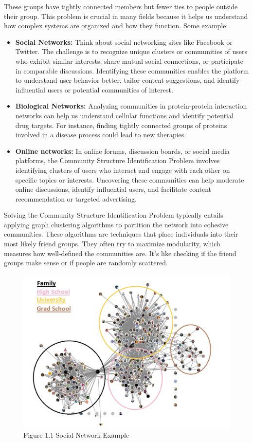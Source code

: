 These groups have tightly connected members but fewer ties to people outside their group.
This problem is crucial in many fields because it helps us understand how complex systems are organized and how they function. Some example: 
\begin{itemize}
\item\textbf{Social Networks: }Think about social networking sites like Facebook or Twitter. The challenge is to recognize unique clusters or communities of users who exhibit similar interests, share mutual social connections, or participate in comparable discussions. Identifying these communities enables the platform to understand user behavior better, tailor content suggestions, and identify influential users or potential communities of interest.
\item\textbf{Biological Networks:} Analyzing communities in protein-protein interaction networks can help us understand cellular functions and identify potential drug targets. For instance, finding tightly connected groups of proteins involved in a disease process could lead to new therapies.
\item\textbf{Online networks:} In online forums, discussion boards, or social media platforms, the Community Structure Identification Problem involves identifying clusters of users who interact and engage with each other on specific topics or interests. Uncovering these communities can help moderate online discussions, identify influential users, and facilitate content recommendation or targeted advertising.

\end{itemize}
Solving the Community Structure Identification Problem typically entails applying graph clustering algorithms to partition the network into cohesive communities. These algorithms are techniques that place individuals into their most likely friend groups. They often try to maximize modularity, which measures how well-defined the communities are. It's like checking if the friend groups make sense or if people are randomly scattered.
\begin{center}
\begin{figure}[!htp]
    \centering
    \includegraphics[width=0.8 \textwidth]{image/social_nx_example.png}
    \caption{Figure 1.1 Social Network Example}
    \label{subsection}
\end{figure}
\end{center}

